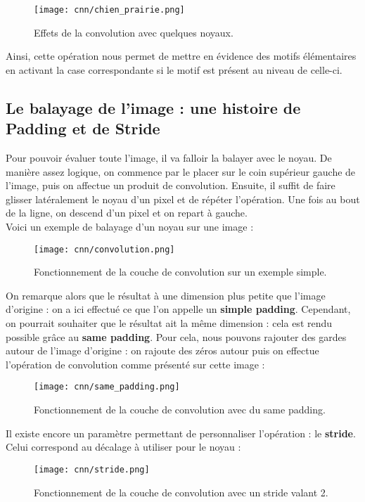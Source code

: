 \begin{figure}[!h]
\centering
\texttt{[image: cnn/chien\_prairie.png]} 
\caption{Effets de la convolution avec quelques noyaux.}
\end{figure}

Ainsi, cette opération nous permet de mettre en évidence des motifs élémentaires en activant la case correspondante si le motif est présent au niveau de celle-ci.

\subsection{Le balayage de l'image : une histoire de Padding et de Stride}

Pour pouvoir évaluer toute l'image, il va falloir la balayer avec le noyau. De manière assez logique, on commence par le placer sur le coin supérieur gauche de l'image, puis on affectue un produit de convolution. Ensuite, il suffit de faire glisser latéralement le noyau d'un pixel et de répéter l'opération. Une fois au bout de la ligne, on descend d'un pixel et on repart à gauche. \\
Voici un exemple de balayage d'un noyau sur une image : 

\begin{figure}[!h]
\centering
\texttt{[image: cnn/convolution.png]}
\caption{Fonctionnement de la couche de convolution sur un exemple simple.}
\end{figure}

On remarque alors que le résultat à une dimension plus petite que l'image d'origine : on a ici effectué ce que l'on appelle un \textbf{simple padding}. Cependant, on pourrait souhaiter que le résultat ait la même dimension : cela est rendu possible grâce au \textbf{same padding}. Pour cela, nous pouvons rajouter des gardes autour de l'image d'origine : on rajoute des zéros autour puis on effectue l'opération de convolution comme présenté sur cette image :

\begin{figure}[!h]
\centering
\texttt{[image: cnn/same\_padding.png]}
\caption{Fonctionnement de la couche de convolution avec du same padding.}
\end{figure}

Il existe encore un paramètre permettant de personnaliser l'opération : le \textbf{stride}. Celui correspond au décalage à utiliser pour le noyau :

\begin{figure}[!h]
\centering
\texttt{[image: cnn/stride.png]}
\caption{Fonctionnement de la couche de convolution avec un stride valant 2.}
\end{figure}
 
